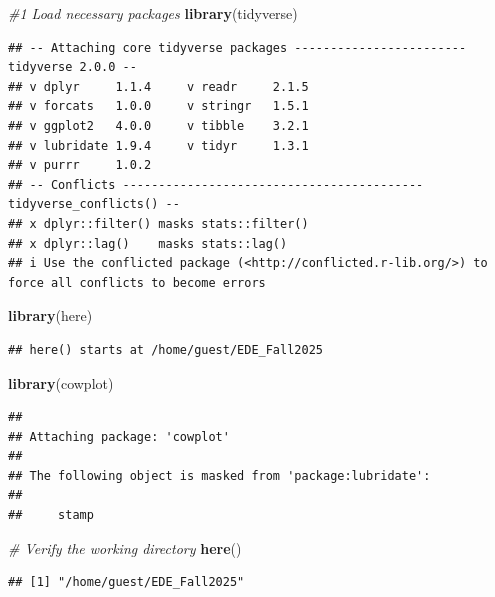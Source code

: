 \documentclass[
]{article}
\newenvironment{Shaded}{\begin{snugshade}}{\end{snugshade}}
\newcommand{\CommentTok}[1]{\textcolor[rgb]{0.56,0.35,0.01}{\textit{#1}}}
\newcommand{\FunctionTok}[1]{\textcolor[rgb]{0.13,0.29,0.53}{\textbf{#1}}}
\newcommand{\NormalTok}[1]{#1}
\begin{document}
\begin{Shaded}
\begin{Highlighting}[]
\CommentTok{\#1 Load necessary packages}
\FunctionTok{library}\NormalTok{(tidyverse)}
\end{Highlighting}
\end{Shaded}

\begin{verbatim}
## -- Attaching core tidyverse packages ------------------------ tidyverse 2.0.0 --
## v dplyr     1.1.4     v readr     2.1.5
## v forcats   1.0.0     v stringr   1.5.1
## v ggplot2   4.0.0     v tibble    3.2.1
## v lubridate 1.9.4     v tidyr     1.3.1
## v purrr     1.0.2     
## -- Conflicts ------------------------------------------ tidyverse_conflicts() --
## x dplyr::filter() masks stats::filter()
## x dplyr::lag()    masks stats::lag()
## i Use the conflicted package (<http://conflicted.r-lib.org/>) to force all conflicts to become errors
\end{verbatim}

\begin{Shaded}
\begin{Highlighting}[]
\FunctionTok{library}\NormalTok{(here)}
\end{Highlighting}
\end{Shaded}

\begin{verbatim}
## here() starts at /home/guest/EDE_Fall2025
\end{verbatim}

\begin{Shaded}
\begin{Highlighting}[]
\FunctionTok{library}\NormalTok{(cowplot)}
\end{Highlighting}
\end{Shaded}

\begin{verbatim}
## 
## Attaching package: 'cowplot'
## 
## The following object is masked from 'package:lubridate':
## 
##     stamp
\end{verbatim}

\begin{Shaded}
\begin{Highlighting}[]
\CommentTok{\# Verify the working directory}
\FunctionTok{here}\NormalTok{()}
\end{Highlighting}
\end{Shaded}

\begin{verbatim}
## [1] "/home/guest/EDE_Fall2025"
\end{verbatim}
\end{document}

